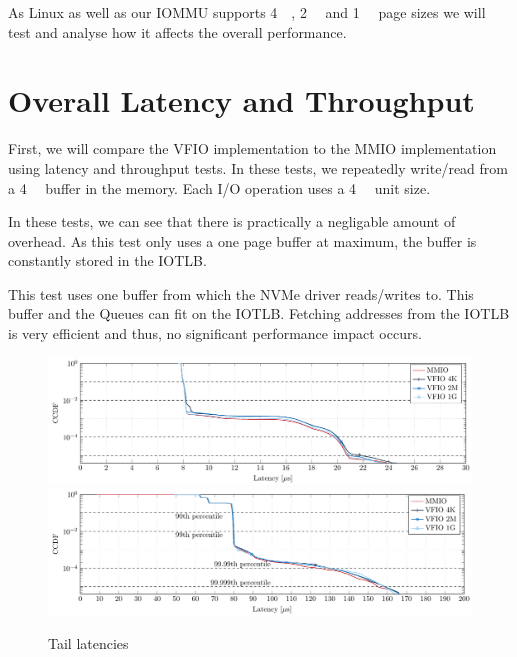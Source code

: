 As Linux as well as our IOMMU supports \qty{4}{\kibi\byte}, \qty{2}{\mebi\byte} and \qty{1}{\gibi\byte} page sizes we will test and analyse how it affects the overall performance.

\section{Overall Latency and Throughput}
First, we will compare the VFIO implementation to the MMIO implementation using latency and throughput tests. In these tests, we repeatedly write/read from a \qty{4}{\kibi\byte} buffer in the memory. Each I/O operation uses a \qty{4}{\kibi\byte} unit size.

In these tests, we can see that there is practically a negligable amount of overhead. As this test only uses a one page buffer at maximum, the buffer is constantly stored in the IOTLB.

This test uses one buffer from which the NVMe driver reads/writes to. This buffer and the Queues can fit on the IOTLB. Fetching addresses from the IOTLB is very efficient and thus, no significant performance impact occurs.

\begin{figure}
    \centering
     {\includegraphics[width=\textwidth]{figures/latency_ccdf_write} \label{fig:ccdf-write}}
     {\includegraphics[width=\textwidth]{figures/latency_ccdf_read} \label{fig:ccdf-read}}
    \caption{Tail latencies}
    \label{fig:ccdf}
\end{figure}

